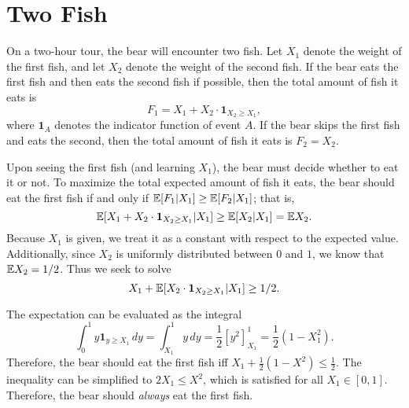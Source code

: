 

\usepackage{url}

\DeclareMathOperator{\cmax}{cmax}
\DeclareMathOperator{\cmin}{cmin}

\newcommand{\code}[1]{\lstinline[basicstyle=\ttfamily]|#1|}

\newcommand{\clsP}{\textbf{P}}
\newcommand{\clsNP}{\textbf{NP}}
\newcommand{\clscoNP}{\textbf{coNP}}

\newcommand{\encode}[1]{\left\langle #1 \right\rangle}
\newcommand{\len}[1]{\left| #1 \right|}

\newcommand{\OR}{\vee}
\newcommand{\AND}{\wedge}
\newcommand{\NOT}[1]{\neg{#1}}
\newcommand{\IMPLIES}{\Rightarrow}
\newcommand{\IFF}{\Leftrightarrow}

\newcommand{\blank}{\sqcup}

\newcommand{\one}{\mathbf{1}}




\section{Two Fish}

On a two-hour tour, the bear will encounter two fish. Let $X_1$ denote the weight of the first fish, and let $X_2$ denote the weight of the second fish. If the bear eats the first fish and then eats the second fish if possible, then the total amount of fish it eats is 
	\[ F_1 = X_1 + X_2 \cdot \one_{X_2 \geq X_1}, \]
where $\one_A$ denotes the indicator function of event $A$. If the bear skips the first fish and eats the second, then the total amount of fish it eats is $F_2 = X_2$.

Upon seeing the first fish (and learning $X_1$), the bear must decide whether to eat it or not. To maximize the total expected amount of fish it eats, the bear should eat the first fish if and only if $\mathbb{E}[F_1|X_1] \geq \mathbb{E}[F_2|X_1]$; that is,
	\[ \E[X_1 + X_2 \cdot \one_{X_2 \geq X_1}|X_1] \geq \E[X_2|X_1] = \E{X_2}. \]
Because $X_1$ is given, we treat it as a constant with respect to the expected value. Additionally, since $X_2$ is uniformly distributed between $0$ and $1$, we know that $\mathbb{E}{X_2} = 1/2$. Thus we seek to solve
	\[ X_1 + \E[X_2 \cdot \one_{X_2 \geq X_1}|X_1] \geq 1/2. \]

The expectation can be evaluated as the integral
	\[ \int_0^1 y \one_{y \geq X_1} \, dy = \int_{X_1}^1 y \,dy = \frac{1}{2} [y^2]_{X_1}^1 = \frac{1}{2}(1-X_1^2). \]
Therefore, the bear should eat the first fish iff $X_1 + \frac{1}{2}(1 - X^2) \leq \frac{1}{2}$. The inequality can be simplified to $2X_1 \leq X^2$, which is satisfied for all $X_1 \in [0,1]$. Therefore, the bear should \emph{always} eat the first fish.

